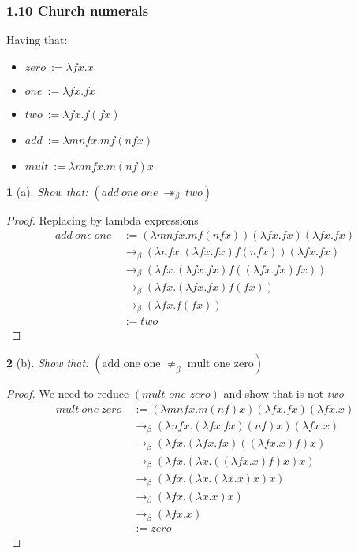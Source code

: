 \documentclass[12pt, a4paper]{article}
\newcommand{\twobeta}{\twoheadrightarrow_\beta}
\newcommand{\onebeta}{\rightarrow_\beta}
\newtheorem*{exercise}{}
\begin{document}
\subsubsection{1.10 Church numerals}
Having that:
\begin{itemize}
    \item $zero \ := \lambda fx. x$
    \item $one \ := \lambda fx. fx$
    \item $two \ := \lambda fx. f(fx)$
    \item $add \ := \lambda mnfx. mf(nfx)$
    \item $mult \ := \lambda mnfx. m(nf)x$
\end{itemize}
\begin{exercise}[a]
    Show that: $(add\ one\ one\ \twobeta\ two)$
\end{exercise}
\begin{proof}
    Replacing by lambda expressions
    \begin{subequations}
        \begin{align}
            add\ one\ one\ &:= (\lambda mnfx. mf(nfx))(\lambda fx. fx)(\lambda fx. fx)\\
            &\onebeta (\lambda nfx. (\lambda fx. fx)f(nfx))(\lambda fx. fx)\\
            &\onebeta (\lambda fx. (\lambda fx. fx)f((\lambda fx. fx)fx))\\
            &\onebeta (\lambda fx. (\lambda fx. fx)f(fx))\\
            &\onebeta (\lambda fx. f(fx))\\
            &:= two
        \end{align}
    \end{subequations}
\end{proof}

\begin{exercise}[b]
    Show that: $(\text{add one one }\neq_\beta \text{ mult one zero})$
\end{exercise}
\begin{proof}
    We need to reduce $(\textit{mult one zero})$ and show that is not \textit{two}
    \begin{subequations}
        \begin{align}
            mult\ one\ zero\ &:= (\lambda mnfx. m(nf)x)(\lambda fx. fx)(\lambda fx. x)\\
            &\onebeta (\lambda nfx. (\lambda fx. fx)(nf)x)(\lambda fx. x)\\
            &\onebeta (\lambda fx. (\lambda fx. fx)((\lambda fx. x)f)x)\\
            &\onebeta (\lambda fx. (\lambda x. ((\lambda fx. x)f)x)x)\\
            &\onebeta (\lambda fx. (\lambda x. (\lambda x. x)x)x)\\
            &\onebeta (\lambda fx. (\lambda x. x)x)\\
            &\onebeta (\lambda fx. x)\\
            &:= zero
        \end{align}
    \end{subequations}
\end{proof}
\end{document}
